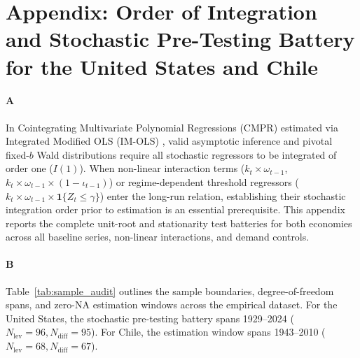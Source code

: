 \section{Appendix: Order of Integration and Stochastic Pre-Testing Battery for the United States and Chile}
\label{app:integration_order}

\paragraph{A}
In Cointegrating Multivariate Polynomial Regressions (CMPR) estimated via Integrated Modified OLS (IM-OLS) \citep{VogelsangWagner2014,VogelsangWagner2024}, valid asymptotic inference and pivotal fixed-$b$ Wald distributions require all stochastic regressors to be integrated of order one ($I(1)$). When non-linear interaction terms ($k_t \times \omega_{t-1}$, $k_t \times \omega_{t-1} \times (1-\iota_{t-1})$) or regime-dependent threshold regressors ($k_t \times \omega_{t-1} \times \mathbf{1}\{Z_t \le \hat{\gamma}\}$) enter the long-run relation, establishing their stochastic integration order prior to estimation is an essential prerequisite. This appendix reports the complete unit-root and stationarity test batteries for both economies across all baseline series, non-linear interactions, and demand controls.

\paragraph{B}
Table~\ref{tab:sample_audit} outlines the sample boundaries, degree-of-freedom spans, and zero-NA estimation windows across the empirical dataset. For the United States, the stochastic pre-testing battery spans 1929--2024 ($N_{\text{lev}} = 96, N_{\text{diff}} = 95$). For Chile, the estimation window spans 1943--2010 ($N_{\text{lev}} = 68, N_{\text{diff}} = 67$).

